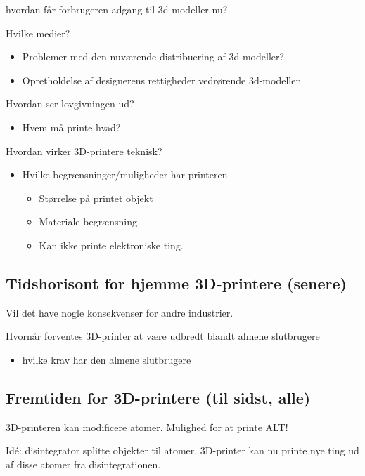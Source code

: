 hvordan får forbrugeren adgang til 3d modeller nu?

Hvilke medier?

\begin{itemize}
	\item Problemer med den nuværende distribuering af 3d-modeller?
	\item Opretholdelse af designerens rettigheder vedrørende 3d-modellen
\end{itemize}

Hvordan ser lovgivningen ud?

\begin{itemize}
	\item Hvem må printe hvad?
\end{itemize}

Hvordan virker 3D-printere teknisk?

\begin{itemize}
	\item Hvilke begrænsninger/muligheder har printeren
	\begin{itemize}
		\item Størrelse på printet objekt
		\item Materiale-begrænsning
		\item Kan ikke printe elektroniske ting.
	\end{itemize}
\end{itemize}



\subsection{Tidshorisont for hjemme 3D-printere (senere)} %
\label{sub:tidshorisont_for_hjemme_3d_printere_senere_}

Vil det have nogle konsekvenser for andre industrier.

Hvornår forventes 3D-printer at være udbredt blandt almene slutbrugere

\begin{itemize}
	\item hvilke krav har den almene slutbrugere
\end{itemize}


\subsection{Fremtiden for 3D-printere (til sidst, alle)} %
\label{sub:fremtiden_for_3d_printere_til_sidst_alle_}

3D-printeren kan modificere atomer. Mulighed for at printe ALT!

Idé: disintegrator splitte objekter til atomer. 3D-printer kan nu printe nye ting ud af disse atomer fra disintegrationen.


